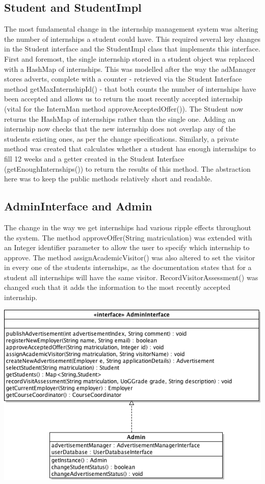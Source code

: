 \documentclass[11pt]{l3deliverable}
\begin{document}
\subsection{Student and StudentImpl}

The most fundamental change in the internship management system was altering the
number of internships a student could have. This required several key changes
in the Student interface and the StudentImpl class that implements this interface.
First and foremost, the single internship stored in a student object was replaced 
with a HashMap of internships. This was modelled after the way the adManager stores
adverts, complete with a counter - retrieved via the Student Interface method 
getMaxInternshipId() - that both counts the number of internships have been 
accepted and allows us to return the most recently accepted internship (vital for the 
InternMan method approveAcceptedOffer()). The Student now returns the HashMap of 
internships rather than the single one. Adding an internship now checks that the new
internship does not overlap any of the students existing ones, as per the change 
specifications. Similarly, a private method was created that calculates whether a
student has enough internships to fill 12 weeks and a getter created in the Student 
Interface (getEnoughInternships()) to return the results of this method. The abstraction 
here was to keep the public methods relatively short and readable. 

\subsection{AdminInterface and Admin}

The change in the way we get internships had various ripple effects throughout the 
system. The method approveOffer(String matriculation) was extended with an Integer
identifier parameter to allow the user to specify which internship to approve. The 
method assignAcademicVisitor() was also altered to set the visitor in every one of
the students internships, as the documentation states that for a student all 
internships will have the same visitor. RecordVisitorAssessment() was changed such
that it adds the information to the most recently accepted internship.

\includegraphics[width=\textwidth]{adminClassDiagram.png}
\end{document}
